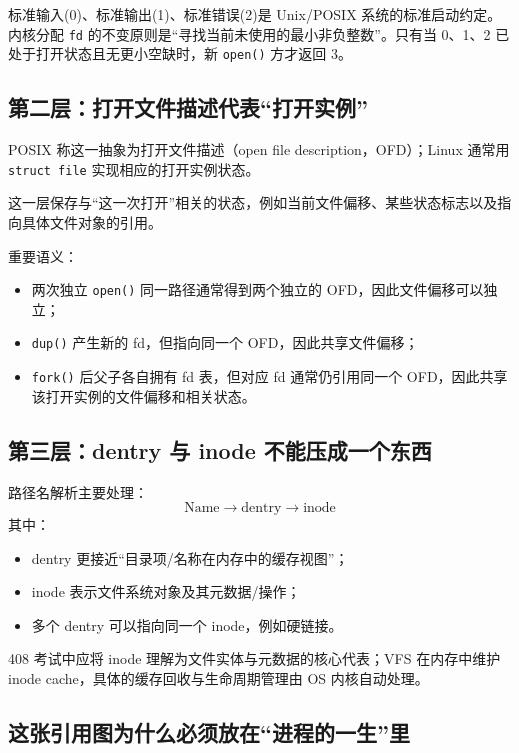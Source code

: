 \documentclass[11pt,a4paper]{ctexart}
\newcommand{\code}[1]{\texttt{#1}}
\begin{document}
\begin{warn}[文件描述符分配规则与 0/1/2 约定]
标准输入(0)、标准输出(1)、标准错误(2)是 Unix/POSIX 系统的标准启动约定。内核分配 \code{fd} 的不变原则是“寻找当前未使用的最小非负整数”。只有当 0、1、2 已处于打开状态且无更小空缺时，新 \code{open()} 方才返回 3。
\end{warn}

\subsection{第二层：打开文件描述代表“打开实例”}

POSIX 称这一抽象为打开文件描述（open file description，OFD）；Linux 通常用 \code{struct file} 实现相应的打开实例状态。

这一层保存与“这一次打开”相关的状态，例如当前文件偏移、某些状态标志以及指向具体文件对象的引用。

重要语义：
\begin{itemize}
\item 两次独立 \code{open()} 同一路径通常得到两个独立的 OFD，因此文件偏移可以独立；
\item \code{dup()} 产生新的 fd，但指向同一个 OFD，因此共享文件偏移；
\item \code{fork()} 后父子各自拥有 fd 表，但对应 fd 通常仍引用同一个 OFD，因此共享该打开实例的文件偏移和相关状态。
\end{itemize}

\subsection{第三层：dentry 与 inode 不能压成一个东西}

路径名解析主要处理：
\[
\boxed{\text{Name}\rightarrow\text{dentry}\rightarrow\text{inode}}
\]
其中：
\begin{itemize}
\item dentry 更接近“目录项/名称在内存中的缓存视图”；
\item inode 表示文件系统对象及其元数据/操作；
\item 多个 dentry 可以指向同一个 inode，例如硬链接。
\end{itemize}

\begin{warn}
408 考试中应将 inode 理解为文件实体与元数据的核心代表；VFS 在内存中维护 inode cache，具体的缓存回收与生命周期管理由 OS 内核自动处理。
\end{warn}

\subsection{这张引用图为什么必须放在“进程的一生”里}
\end{document}
